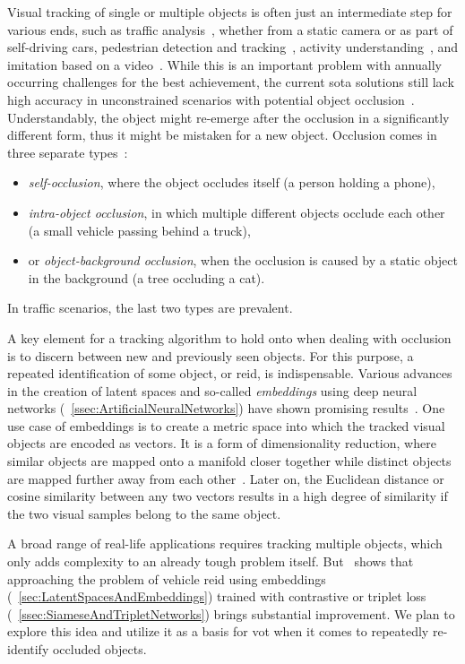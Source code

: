 Visual tracking of single or multiple objects is often just an intermediate step for various ends, such as traffic analysis~\cite{tang2019cityflow}, whether from a static camera or as part of self-driving cars, pedestrian detection and tracking~\cite{lealtaixe2017tracking}, activity understanding~\cite{finn2017oneshotimitation}, and imitation based on a video~\cite{peng2018sfv}. While this is an important problem with annually occurring challenges for the best achievement, the current \gls{sota} solutions still lack high accuracy in unconstrained scenarios with potential object occlusion~\cite{jiyan2007robustocclusion}. Understandably, the object might re-emerge after the occlusion in a significantly different form, thus it might be mistaken for a new object. Occlusion comes in three separate types~\cite{gabriel2003sotamot}:
\begin{itemize}
    \item \emph{self-occlusion}, where the object occludes itself (a person holding a phone),
    \item \emph{intra-object occlusion}, in which multiple different objects occlude each other (a small vehicle passing behind a truck),
    \item or \emph{object-background occlusion}, when the occlusion is caused by a static object in the background (a tree occluding a cat).
\end{itemize}
In traffic scenarios, the last two types are prevalent.

A key element for a tracking algorithm to hold onto when dealing with occlusion is to discern between new and previously seen objects. For this purpose, a repeated identification of some object, or \gls{reid}, is indispensable. Various advances in the creation of latent spaces and so-called \emph{embeddings} using deep neural networks (\sectionstr{}~\ref{ssec:ArtificialNeuralNetworks}) have shown promising results~\cite{schroff2015facenet, taigman2014deepface}. One use case of embeddings is to create a metric space into which the tracked visual objects are encoded as vectors. It is a form of dimensionality reduction, where similar objects are mapped onto a manifold closer together while distinct objects are mapped further away from each other~\cite{hadsell2006dimreduction}. Later on, the Euclidean distance or cosine similarity between any two vectors results in a high degree of similarity if the two visual samples belong to the same object.

A broad range of real-life applications requires tracking multiple objects, which only adds complexity to an already tough problem itself. But~\cite{kuma2019vehiclereid} shows that approaching the problem of vehicle \gls{reid} using embeddings (\sectionstr{}~\ref{sec:LatentSpacesAndEmbeddings}) trained with contrastive or triplet loss (\sectionstr{}~\ref{ssec:SiameseAndTripletNetworks}) brings substantial improvement. We plan to explore this idea and utilize it as a basis for \gls{vot} when it comes to repeatedly re-identify occluded objects.

